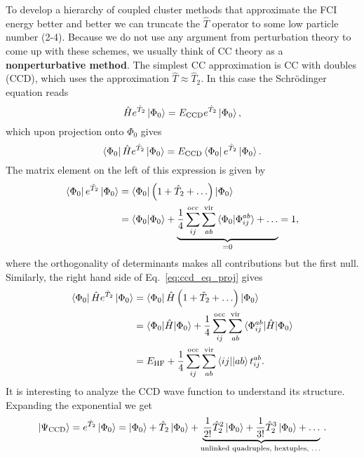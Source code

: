 \documentclass[../Main/chem532-notes.tex]{subfiles}
\begin{document}
To develop a hierarchy of coupled cluster methods that approximate the FCI energy better and better we can truncate the $\hat{T}$ operator to some low particle number (2-4).
Because we do not use any argument from perturbation theory to come up with these schemes, we usually think of CC theory as a \textbf{nonperturbative method}.
The simplest CC approximation is CC with doubles (CCD), which uses the approximation $\hat{T} \approx \hat{T}_2$.
In this case the Schr{\"o}dinger equation reads
\begin{equation}
\hat{H} e^{\hat{T}_2}\ket{\Phi_0} = E_\mathrm{CCD} e^{\hat{T}_2}\ket{\Phi_0},
\end{equation}
which upon projection onto $\Phi_0$ gives
\begin{equation}
\label{eq:ccd_eq_proj}
\bra{\Phi_0}\hat{H} e^{\hat{T}_2}\ket{\Phi_0} = E_\mathrm{CCD} \bra{\Phi_0}e^{\hat{T}_2}\ket{\Phi_0}.
\end{equation}
The matrix element on the left of this expression is given by
\begin{equation}
\begin{split}
\bra{\Phi_0}e^{\hat{T}_2}\ket{\Phi_0} & = \bra{\Phi_0}\left(1 + \hat{T}_2 + \ldots\right)\ket{\Phi_0} \\
& =  \braket{\Phi_0 | \Phi_0} + \underbrace{ \frac{1}{4} \sum_{ij}^{\mathrm{occ}} \sum_{ab}^{\mathrm{vir}} \braket{\Phi_0 | \Phi_{ij}^{ab}} + \ldots}_{= 0} = 1,
 \end{split}
\end{equation}
where the orthogonality of determinants makes all contributions but the first null.
Similarly, the right hand side of Eq.~\eqref{eq:ccd_eq_proj} gives
\begin{equation}
\begin{split}
\bra{\Phi_0}\hat{H}e^{\hat{T}_2}\ket{\Phi_0} & = \bra{\Phi_0}\hat{H}\left(1 + \hat{T}_2 + \ldots\right)\ket{\Phi_0} \\
& =  \braket{\Phi_0 | \hat{H} | \Phi_0} + \frac{1}{4} \sum_{ij}^{\mathrm{occ}} \sum_{ab}^{\mathrm{vir}} \braket{\Phi_{ij}^{ab} |\hat{H} | \Phi_0} \\
& = E_{\mathrm{HF}} + 
\frac{1}{4} \sum_{ij}^{\mathrm{occ}} \sum_{ab}^{\mathrm{vir}} \bra{ij}\!\ket{ab} t_{ij}^{ab}.
 \end{split}
\end{equation}
It is interesting to analyze the CCD wave function to understand its structure. Expanding the exponential we get
\begin{equation}
\ket{\Psi_{\mathrm{CCD}}} = e^{\hat{T}_2} \ket{\Phi_0}
= \ket{\Phi_0} + \hat{T}_2 \ket{\Phi_0} + \underbrace{\frac{1}{2!}\hat{T}_2^2\ket{\Phi_0} + \frac{1}{3!}\hat{T}_2^3\ket{\Phi_0} + \ldots}_{\text{unlinked quadruples, hextuples, \ldots}}. 
\end{equation}
\end{document}
